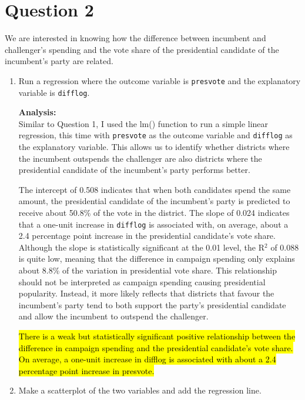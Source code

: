 \documentclass[12pt,letterpaper]{article}
\begin{document}
\section*{Question 2}
\noindent We are interested in knowing how the difference between incumbent and challenger's spending and the vote share of the presidential candidate of the incumbent's party are related.
	\begin{enumerate}
		\item Run a regression where the outcome variable is \texttt{presvote} and the explanatory variable is \texttt{difflog}.
		
		
		
		
		\textbf{Analysis:}\\
		Similar to Question 1, I used the lm() function to run a simple linear regression, this time with \texttt{presvote} as the outcome variable and \texttt{difflog} as the explanatory variable. This allows us to identify whether districts where the incumbent outspends the challenger are also districts where the presidential candidate of the incumbent's party performs better.
		
		The intercept of 0.508 indicates that when both candidates spend the same amount, the presidential candidate of the incumbent's party is predicted to receive about 50.8\% of the vote in the district. The slope of 0.024 indicates that a one-unit increase in \texttt{difflog} is associated with, on average, about a 2.4 percentage point increase in the presidential candidate's vote share. Although the slope is statistically significant at the 0.01 level, the R$^2$ of 0.088 is quite low, meaning that the difference in campaign spending only explains about 8.8\% of the variation in presidential vote share. This relationship should not be interpreted as campaign spending causing presidential popularity. Instead, it more likely reflects that districts that favour the incumbent's party tend to both support the party's presidential candidate and allow the incumbent to outspend the challenger. 
		
		\hl{There is a weak but statistically significant positive relationship between the difference in campaign spending and the presidential candidate's vote share. On average, a one-unit increase in difflog is associated with about a 2.4 percentage point increase in presvote.}
		
		\item Make a scatterplot of the two variables and add the regression line. 
		

\end{enumerate}
\end{document}
